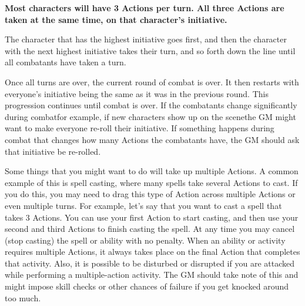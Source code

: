 \documentclass[twoside]{book}
\begin{document}
 \textbf{ Most characters will have 3 Actions per turn. All
             three Actions are taken at the same time, on that
             character's initiative. }


  

  

  
    {  
    The character that has the highest initiative goes
             first, and then the character with the next highest
             initiative takes their turn, and so forth down the line
             until all combatants have taken a turn. 
    }
  
    {  
    Once all turns are over, the current round of combat
             is over. It then restarts with everyone's initiative
             being the same as it was in the previous round. This
             progression continues until combat is over. If the
             combatants change significantly during combatfor
             example, if new characters show up on the scenethe GM
             might want to make everyone re-roll their initiative. If
             something happens during combat that changes how many
             Actions the combatants have, the GM should ask that
             initiative be re-rolled. 
    }
  
    {  
    Some things that you might want to do will take up
             multiple Actions. A common example of this is spell casting,
             where many spells take several Actions to cast. If you do
             this, you may need to drag this type of Action across
             multiple Actions or even multiple turns. For example,
             let's say that you want to cast a spell that takes 3
             Actions. You can use your first Action to start casting, and
             then use your second and third Actions to finish casting the
             spell. At any time you may cancel (stop casting) the spell
             or ability with no penalty. When an ability or activity
             requires multiple Actions, it always takes place on the
             final Action that completes that activity. Also, it is
             possible to be disturbed or disrupted if you are attacked
             while performing a multiple-action activity. The GM should
             take note of this and might impose skill checks or other
             chances of failure if you get knocked around too much.
             
    }
  
\end{document}
